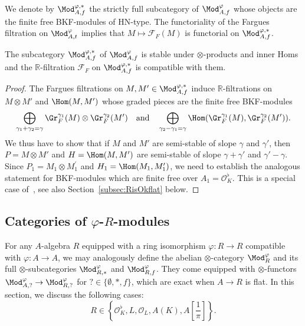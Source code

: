 We denote by $\Mod_{A,f}^{\varphi,\ast}$ the strictly full subcategory of $\Mod_{A,f}^{\varphi}$ whose objects are the finite free BKF-modules of HN-type. The functoriality of the Fargues filtration on $\Mod_{A,t}^{\varphi}$ implies that $M\mapsto\mathcal{F}_{F}(M)$ is functorial on $\Mod_{A,f}^{\varphi,\ast}$.

\begin{prop}\label{prop:catOfHNTypeTensor}
The subcategory $\Mod_{A,f}^{\varphi,\ast}$ of $\Mod_{A,f}^{\varphi}$ is stable under $\otimes$-products and inner Homs and the $\mathbb{R}$-filtration $\mathcal{F}_{F}$ on $\Mod_{A,f}^{\varphi,\ast}$ is compatible with them.
\end{prop}
\begin{proof}
The Fargues filtrations on $M,M'\in\Mod_{A,f}^{\varphi,\ast}$ induce $\mathbb{R}$-filtrations on $M\otimes M'$ and $\Hom(M,M')$ whose graded pieces are the finite free BKF-modules
\[
\bigoplus_{\gamma_{1}+\gamma_{2}=\gamma}\Gr_{F}^{\gamma_{1}}(M)\otimes\Gr_{F}^{\gamma_{2}}(M')\quad\text{and}\quad\bigoplus_{\gamma_{2}-\gamma_{1}=\gamma}\Hom(\Gr_{F}^{\gamma_{1}}(M),\Gr_{F}^{\gamma_{2}}(M')).
\]
We thus have to show that if $M$ and $M'$ are semi-stable of slope $\gamma$ and $\gamma'$, then $P=M\otimes M'$ and $H=\Hom(M,M')$ are semi-stable of slope $\gamma+\gamma'$ and $\gamma'-\gamma$. Since $P_{1}=M_{1}\otimes M_{1}^{\prime}$ and $H_{1}=\Hom(M_{1},M_{1}^{\prime})$, we need to establish the analogous statement for BKF-modules which are finite free over $A_{1}=\mathcal{O}_{K}^{\flat}$. This is a special case of~\cite[\S 5.3]{Co16}, see also Section~\ref{subsec:RisOkflat} below.
\end{proof}

\subsection{Categories of \texorpdfstring{$\varphi$}{phi}-\texorpdfstring{$R$}{R}-modules}

For any $A$-algebra $R$ equipped with a ring isomorphism $\varphi:R\rightarrow R$ compatible with $\varphi:A\rightarrow A$, we may analogously define the abelian $\otimes$-category $\Mod_{R}^{\varphi}$ and its full $\otimes$-subcategories $\Mod_{R,\ast}^{\varphi}$ and $\Mod_{R,f}^{\varphi}$. They come equipped with $\otimes$-functors $\Mod_{A,?}^{\varphi}\rightarrow\Mod_{R,?}^{\varphi}$ for $?\in\{\emptyset,\ast,f\}$, which are exact when $A\rightarrow R$ is flat. In this section, we discuss the following cases:
\[
R\in\left\{ \mathcal{O}_{K}^{\flat},L,\mathcal{O}_{L},A(K),A\left[{\frac{1}{\pi}}\right]\right\}.
\]

